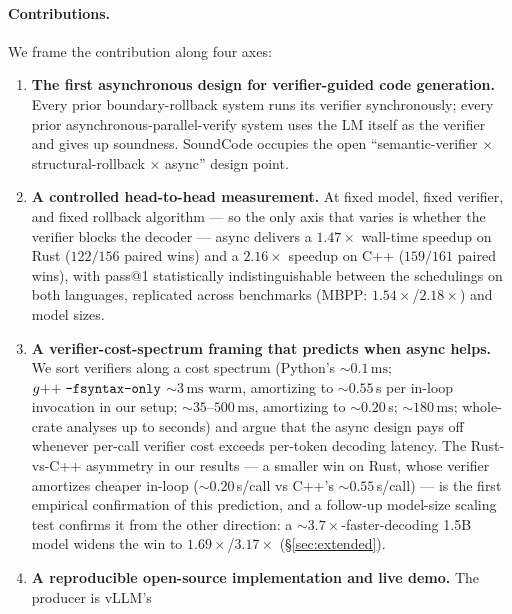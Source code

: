 \paragraph{Contributions.} We frame the contribution along four axes:
\begin{enumerate}[itemsep=2pt,topsep=2pt]
\item \textbf{The first asynchronous design for verifier-guided code
  generation.} Every prior boundary-rollback system
  \citep{jiang2024rocode,wang2025semguard,ugare2025itergen} runs its
  verifier synchronously; every prior asynchronous-parallel-verify
  system \citep{leviathan2023speculative,chen2023speculative,fu2024lookahead}
  uses the LM itself as the verifier and gives up soundness.
  SoundCode occupies the open ``semantic-verifier $\times$
  structural-rollback $\times$ async'' design point.
\item \textbf{A controlled head-to-head measurement.} At fixed model,
  fixed verifier, and fixed rollback algorithm --- so the only axis
  that varies is whether the verifier blocks the decoder --- async
  delivers a $1.47\times$ wall-time speedup on Rust ($122/156$
  paired wins) and a $2.16\times$ speedup on C++ ($159/161$ paired
  wins), with pass@1 statistically indistinguishable between the
  schedulings on both languages, replicated across benchmarks
  (MBPP: $1.54\times$/$2.18\times$) and model sizes.
\item \textbf{A verifier-cost-spectrum framing that predicts when
  async helps.} We sort verifiers along a cost spectrum (Python's
   $\sim$$0.1\,\mathrm{ms}$; $g{+}{+}\;
  \texttt{-fsyntax-only}$ $\sim$$3\,\mathrm{ms}$ warm, amortizing to
  $\sim$$0.55$\,s per in-loop invocation in our setup;
  $\sim$$35$--$500\,\mathrm{ms}$, amortizing to
  $\sim$$0.20$\,s; 
  $\sim$$180\,\mathrm{ms}$;
  whole-crate analyses up to seconds) and argue that the async design
  pays off whenever per-call verifier cost exceeds per-token decoding
  latency. The Rust-vs-C++ asymmetry in our results --- a smaller
  win on Rust, whose verifier amortizes cheaper in-loop
  ($\sim$$0.20$\,s/call vs C++'s $\sim$$0.55$\,s/call) --- is the
  first empirical confirmation of this prediction, and a
  follow-up model-size scaling test confirms it from the other
  direction: a ${\sim}3.7\times$-faster-decoding 1.5B model widens
  the
  win to $1.69\times$/$3.17\times$ (\S\ref{sec:extended}).
\item \textbf{A reproducible open-source implementation and live
  demo.} The producer is vLLM's 

\end{enumerate}
